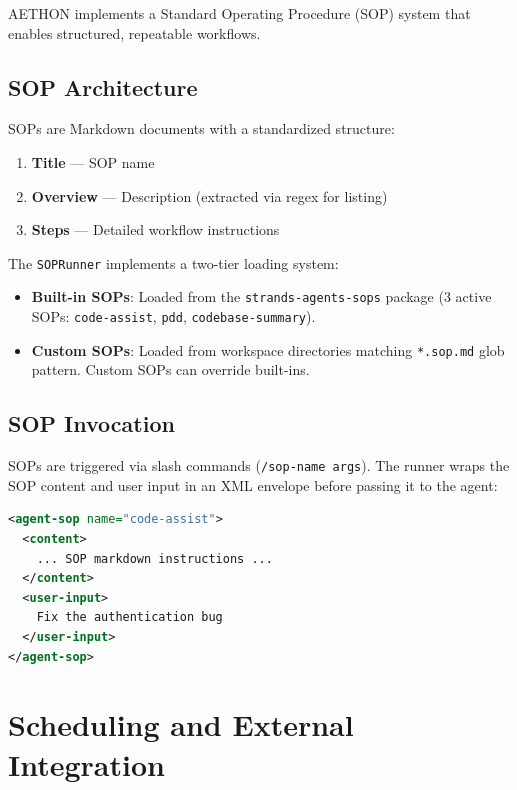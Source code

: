 \documentclass[9pt,twocolumn,letterpaper]{extarticle}
\begin{document}
AETHON implements a Standard Operating Procedure (SOP) system that enables structured, repeatable workflows.

\subsection{SOP Architecture}

SOPs are Markdown documents with a standardized structure:
\begin{enumerate}[noitemsep,topsep=3pt]
  \item \textbf{Title} --- SOP name
  \item \textbf{Overview} --- Description (extracted via regex for listing)
  \item \textbf{Steps} --- Detailed workflow instructions
\end{enumerate}

The \texttt{SOPRunner} implements a two-tier loading system:
\begin{itemize}[noitemsep,topsep=3pt]
  \item \textbf{Built-in SOPs}: Loaded from the \texttt{strands-agents-sops} package (3 active SOPs: \texttt{code-assist}, \texttt{pdd}, \texttt{codebase-summary}).
  \item \textbf{Custom SOPs}: Loaded from workspace directories matching \texttt{*.sop.md} glob pattern. Custom SOPs can override built-ins.
\end{itemize}

\subsection{SOP Invocation}

SOPs are triggered via slash commands (\texttt{/sop-name args}).
The runner wraps the SOP content and user input in an XML envelope before passing it to the agent:

\begin{lstlisting}[language=XML,caption={SOP invocation envelope format.},label=lst:sop,morekeywords={agent-sop,content,user-input}]
<agent-sop name="code-assist">
  <content>
    ... SOP markdown instructions ...
  </content>
  <user-input>
    Fix the authentication bug
  </user-input>
</agent-sop>
\end{lstlisting}

\section{Scheduling and External Integration}
\label{sec:scheduling}
\end{document}
